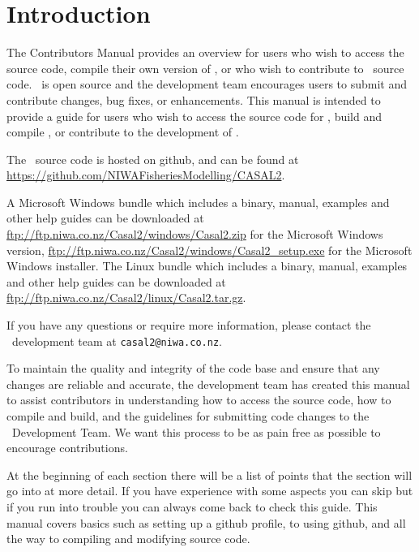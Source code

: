 \section{Introduction\label{sec:Introduction}}

The Contributors Manual provides an overview for users who wish to access the source code, compile their own version of \CNAME , or who wish to contribute to \CNAME\ source code. \CNAME\ is open source and the development team encourages users to submit and contribute changes, bug fixes, or enhancements. This manual is intended to provide a guide for users who wish to access the source code for \CNAME , build and compile  \CNAME , or contribute to the development of \CNAME . 

The \CNAME\ source code is hosted on github, and can be found at \url{https://github.com/NIWAFisheriesModelling/CASAL2}.

A Microsoft Windows bundle which includes a binary, manual, examples and other help guides can be downloaded at \url{ftp://ftp.niwa.co.nz/Casal2/windows/Casal2.zip} for the Microsoft Windows version, \url{ftp://ftp.niwa.co.nz/Casal2/windows/Casal2_setup.exe} for the Microsoft Windows installer. The Linux bundle which includes a binary, manual, examples and other help guides can be downloaded at \url{ftp://ftp.niwa.co.nz/Casal2/linux/Casal2.tar.gz}.

If you have any questions or require more information, please contact the \CNAME\ development team at \texttt{casal2@niwa.co.nz}.  

To maintain the quality and integrity of the code base and ensure that any changes are reliable and accurate, the development team has created this manual to assist contributors in understanding how to access the source code, how to compile and build, and the guidelines for submitting code changes to the \CNAME\ Development Team. We want this process to be as pain free as possible to encourage contributions. 

At the beginning of each section there will be a list of points that the section will go into at more detail. If you have experience with some aspects you can skip but if you run into trouble you can always come back to check this guide. This manual covers basics such as setting up a github profile, to using github, and all the way to compiling and modifying source code.
